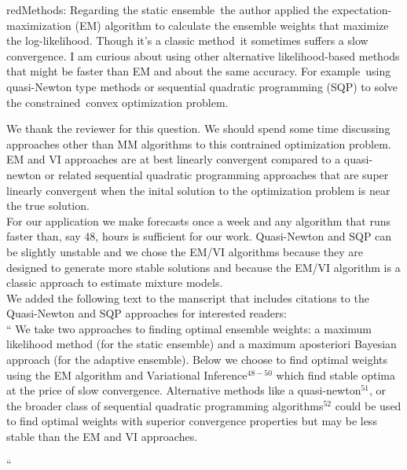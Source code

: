 \documentclass[
  fontsize=11pt,
  paper=a4,
  parskip=half,
  enlargefirstpage=on,    %
  fromalign=right,        %
  fromphone=on,           %
  fromrule=aftername,     %
  addrfield=on,           %
  backaddress=on,         %
  subject=beforeopening,  %
  locfield=narrow,        %
  foldmarks=on,           %
]{scrlttr2}
\begin{document}
    \begin{commt}{red}{Methods: Regarding the static ensemble\, the author applied the expectation-maximization (EM) algorithm to calculate the ensemble weights that maximize the log-likelihood. Though it’s a classic method\, it sometimes suffers a slow convergence. I am curious about using other alternative likelihood-based methods that might be faster than EM and about the same accuracy. For example\, using quasi-Newton type methods or sequential quadratic programming (SQP) to solve the constrained\, convex optimization problem.}

      We thank the reviewer for this question. We should spend some time discussing approaches other than MM algorithms to this contrained optimization problem.
      EM and VI approaches are at best linearly convergent compared to a quasi-newton or related sequential quadratic programming approaches that are super linearly convergent when the inital solution to the optimization problem is near the true solution.\\

      For our application we make forecasts once a week and any algorithm that runs faster than, say 48, hours is sufficient for our work.
      Quasi-Newton and SQP can be slightly unstable and we chose the EM/VI algorithms because they are designed to generate more stable solutions and because the EM/VI algorithm is a classic approach to estimate mixture models.\\

      We added the following text to the manscript that includes citations to the Quasi-Newton and SQP approaches for interested readers:\\

      `` We take two approaches to finding optimal ensemble weights: a maximum likelihood method (for the static ensemble) and a maximum aposteriori Bayesian approach (for the adaptive ensemble).
      Below we choose to find optimal weights using the EM algorithm and Variational Inference$^{48-50}$ which find stable optima at the price of slow convergence.
      Alternative methods like a quasi-newton$^{51}$, or the broader class of sequential quadratic programming algorithms$^{52}$ could be used to find optimal weights with superior convergence properties but may be less stable than the EM and VI approaches. 

 ``
    \end{commt}
\end{document}
